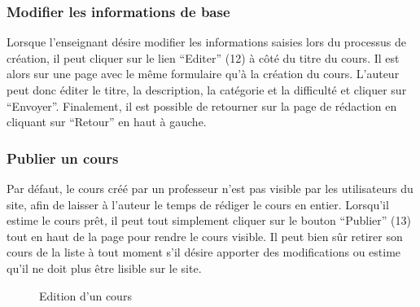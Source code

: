 \documentclass[letterpaper,10pt,oneside]{sphinxmanual}
\begin{document}
\subsubsection{Modifier les informations de base}
\label{functionalities:modifier-les-informations-de-base}
Lorsque l'enseignant désire modifier les informations saisies lors du processus de création, il peut cliquer sur le lien ``Editer'' (12) à côté du titre du cours. Il est alors sur une page avec le même formulaire qu'à la création du cours. L'auteur peut donc éditer le titre, la description, la catégorie et la difficulté et cliquer sur ``Envoyer''. Finalement, il est possible de retourner sur la page de rédaction en cliquant sur ``Retour'' en haut à gauche.


\subsubsection{Publier un cours}
\label{functionalities:publier-un-cours}
Par défaut, le cours créé par un professeur n'est pas visible par les utilisateurs du site, afin de laisser à l'auteur le temps de rédiger le cours en entier. Lorsqu'il estime le cours prêt, il peut tout simplement cliquer sur le bouton ``Publier'' (13) tout en haut de la page pour rendre le cours visible. Il peut bien sûr retirer son cours de la liste à tout moment s'il désire apporter des modifications ou estime qu'il ne doit plus être lisible sur le site.
\begin{figure}[htbp]
\centering
\capstart

\caption{Edition d'un cours}\end{figure}
\end{document}
